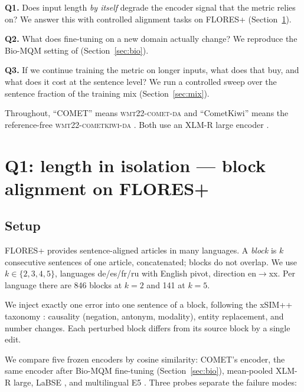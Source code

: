\documentclass[11pt]{article}
\newcommand{\cometda}{\textsc{wmt22-comet-da}}
\newcommand{\kiwi}{\textsc{wmt22-cometkiwi-da}}
\begin{document}
\textbf{Q1.} Does input length \emph{by itself} degrade the encoder signal that the metric relies on?
We answer this with controlled alignment tasks on FLORES+ (Section~\ref{sec:isolation}).

\textbf{Q2.} What does fine-tuning on a new domain actually change?
We reproduce the Bio-MQM setting of \citet{zouhar2024biomqm} (Section~\ref{sec:bio}).

\textbf{Q3.} If we continue training the metric on longer inputs, what does that buy, and what does it cost at the sentence level?
We run a controlled sweep over the sentence fraction of the training mix (Section~\ref{sec:mix}).

Throughout, ``COMET'' means \cometda{} \citep{rei2022comet} and ``CometKiwi'' means the reference-free \kiwi{} \citep{rei2022cometkiwi}.
Both use an XLM-R large encoder \citep{conneau2020xlmr}.

\section{Q1: length in isolation --- block alignment on FLORES+}
\label{sec:isolation}

\subsection{Setup}

FLORES+ \citep{nllb2022,oldi2024flores} provides sentence-aligned articles in many languages.
A \emph{block} is $k$ consecutive sentences of one article, concatenated; blocks do not overlap.
We use $k \in \{2,3,4,5\}$, languages de/es/fr/ru with English pivot, direction en$\to$xx.
Per language there are 846 blocks at $k{=}2$ and 141 at $k{=}5$.

We inject exactly one error into one sentence of a block, following the xSIM++ taxonomy \citep{chen2023xsimpp}: causality (negation, antonym, modality), entity replacement, and number changes.
Each perturbed block differs from its source block by a single edit.

We compare five frozen encoders by cosine similarity: COMET's encoder, the same encoder after Bio-MQM fine-tuning (Section~\ref{sec:bio}), mean-pooled XLM-R large, LaBSE \citep{feng2022labse}, and multilingual E5 \citep{wang2022e5}.
Three probes separate the failure modes:
\end{document}
